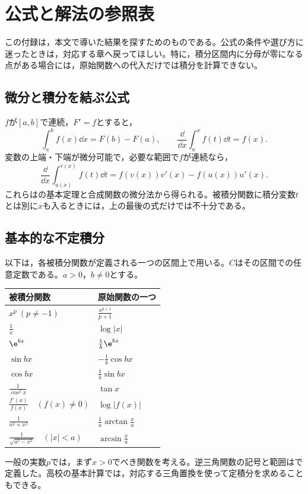 \chapter{公式と解法の参照表}\label{章:参照表}
この付録は，本文で導いた結果を探すためのものである。公式の条件や選び方に迷ったときは，対応する章へ戻ってほしい。特に，積分区間内に分母が零になる点がある場合には，原始関数への代入だけでは積分を計算できない。

\section{微分と積分を結ぶ公式}
$f$が$[a,b]$で連続，$F'=f$とすると，
\[
 \int_a^b f(x)\dd x=F(b)-F(a),\qquad
 \frac{\dd}{\dd x}\int_a^x f(t)\dd t=f(x).
\]
変数の上端・下端が微分可能で，必要な範囲で$f$が連続なら，
\[
 \frac{\dd}{\dd x}\int_{u(x)}^{v(x)}f(t)\dd t
 =f(v(x))v'(x)-f(u(x))u'(x).
\]
これらはの基本定理と合成関数の微分法から得られる。被積分関数に積分変数$t$とは別に$x$も入るときには，上の最後の式だけでは不十分である。

\section{基本的な不定積分}
以下は，各被積分関数が定義される一つの区間上で用いる。$C$はその区間での任意定数である。$a>0$，$b\ne0$とする。
\begin{longtable}{@{}ll@{}}
\toprule
被積分関数 & 原始関数の一つ\\
\midrule
\endhead
$x^p\ (p\ne-1)$ & $\frac{x^{p+1}}{p+1}$\\[4pt]
$\frac1x$ & $\log|x|$\\[4pt]
$\e^{bx}$ & $\frac1b\e^{bx}$\\[4pt]
$\sin bx$ & $-\frac1b\cos bx$\\[4pt]
$\cos bx$ & $\frac1b\sin bx$\\[4pt]
$\frac1{\cos^2x}$ & $\tan x$\\[4pt]
$\frac{f'(x)}{f(x)}\quad(f(x)\ne0)$ & $\log|f(x)|$\\[4pt]
$\frac1{a^2+x^2}$ & $\frac1a\arctan\frac xa$\\[4pt]
$\frac1{\sqrt{a^2-x^2}}\quad(|x|<a)$ & $\arcsin\frac xa$\\[4pt]
\bottomrule
\end{longtable}
一般の実数$p$では，まず$x>0$でべき関数を考える。逆三角関数の記号と範囲はで定義した。高校の基本計算では，対応する三角置換を使って定積分を求めることもできる。

